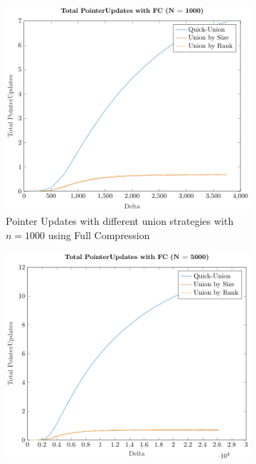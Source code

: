 \begin{figure}[ht]
    \centering
    \begin{subfigure}{0.32\textwidth}
        \centering
        \includegraphics[width=\textwidth]{../images/plotFCFull1000_PointerUpdates.pdf}
        \caption{Pointer Updates with different union strategies with $n = 1000$ using Full Compression}
    \end{subfigure}%
    \hfill
    \begin{subfigure}{0.32\textwidth}
        \centering
        \includegraphics[width=\textwidth]{../images/plotFCFull5000_PointerUpdates.pdf}

\end{subfigure}
\end{figure}
